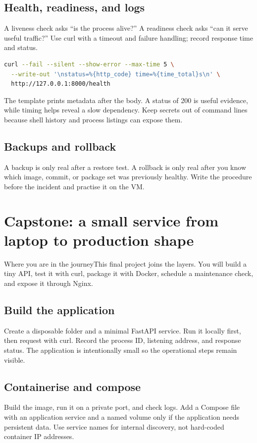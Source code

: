 \documentclass[11pt,a4paper,openany]{book}
\newcommand{\command}[1]{\texttt{\small\detokenize{#1}}}
\newcommand{\lesson}[1]{\begin{mentalbox}{Where you are in the journey}#1\end{mentalbox}}
\begin{document}
\section{Health, readiness, and logs}
A liveness check asks ``is the process alive?'' A readiness check asks ``can it serve useful traffic?'' Use curl with a timeout and failure handling; record response time and status.
\begin{lstlisting}[language=bash]
curl --fail --silent --show-error --max-time 5 \
  --write-out '\nstatus=%{http_code} time=%{time_total}s\n' \
  http://127.0.0.1:8000/health
\end{lstlisting}
The \command{--write-out} template prints metadata after the body. A status of 200 is useful evidence, while timing helps reveal a slow dependency. Keep secrets out of command lines because shell history and process listings can expose them.
\section{Backups and rollback}
A backup is only real after a restore test. A rollback is only real after you know which image, commit, or package set was previously healthy. Write the procedure before the incident and practise it on the VM.

\chapter{Capstone: a small service from laptop to production shape}
\lesson{This final project joins the layers. You will build a tiny API, test it with curl, package it with Docker, schedule a maintenance check, and expose it through Nginx.}
\section{Build the application}
Create a disposable folder and a minimal FastAPI service. Run it locally first, then request \command{/health} with curl. Record the process ID, listening address, and response status. The application is intentionally small so the operational steps remain visible.
\section{Containerise and compose}
Build the image, run it on a private port, and check logs. Add a Compose file with an application service and a named volume only if the application needs persistent data. Use service names for internal discovery, not hard-coded container IP addresses.
\end{document}

